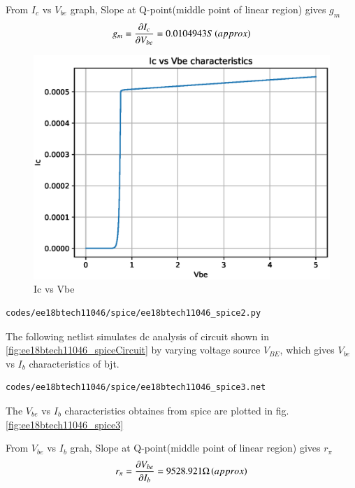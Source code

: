 \begin{enumerate}[label=\arabic*.,ref=\theenumi]
From $I_{c}$ vs $V_{be}$ graph, Slope at Q-point(middle point of linear region) gives $g_{m}$
\begin{align}
g_{m} = \frac{\partial I_{c}}{\partial V_{be}} = 0.0104943S\left(approx\right)
\end{align}
%
\begin{figure}[!ht]
\centering
\includegraphics[width=\columnwidth]{./figs/ee18btech11046/ee18btech11046_2.eps}
\caption{Ic vs Vbe}
\label{fig:ee18btech11046_spice2}
\end{figure}
%

\begin{lstlisting}
codes/ee18btech11046/spice/ee18btech11046_spice2.py
\end{lstlisting}

The following netlist simulates dc analysis of circuit shown in \ref{fig:ee18btech11046_spiceCircuit} by varying voltage source $V_{BE}$, which gives $V_{be}$ vs $I_{b}$ characteristics of bjt.
\begin{lstlisting}
codes/ee18btech11046/spice/ee18btech11046_spice3.net
\end{lstlisting}

The $V_{be}$ vs $I_{b}$ characteristics obtaines from spice are plotted in  fig.\ref{fig:ee18btech11046_spice3}

From $V_{be}$ vs $I_{b}$ grah, Slope at Q-point(middle point of linear region) gives $r_{\pi}$
\begin{align}
r_{\pi} = \frac{\partial V_{be}}{\partial I_{b}} = 9528.921\ohm \left(approx\right)
\end{align}


\end{enumerate}
